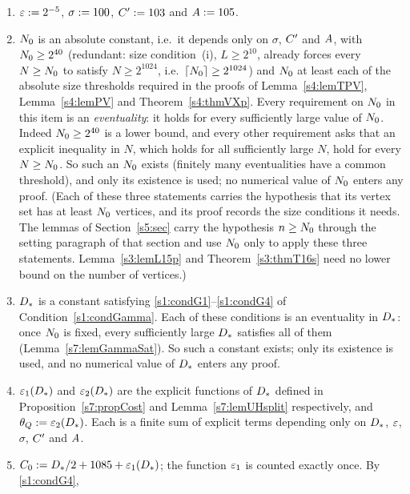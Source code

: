 \begin{definition}\label{s1:defConstants}
\begin{enumerate}
\item[(i)] $\varepsilon\mathrel{:=}2^{-5}$, $\sigma\mathrel{:=}100$, $C'\mathrel{:=}103$ and
$A\mathrel{:=}105$.
\item[(ii)] $N_{0}$ is an absolute constant, i.e.\ it depends only on $\sigma$,
$C'$ and $A$, with $N_{0}\ge2^{40}$ (redundant: size condition~(i),
$L\ge2^{10}$, already forces every $N\ge N_{0}$ to satisfy $N\ge2^{1024}$,
i.e.\ $\lceil N_{0}\rceil\ge2^{1024}$) and $N_{0}$ at least
each of the absolute size thresholds required in the proofs of
Lemma~\ref{s4:lemTPV}, Lemma~\ref{s4:lemPV} and Theorem~\ref{s4:thmVXp}.
Every requirement on $N_{0}$ in this item is an \emph{eventuality}: it holds
for every sufficiently large value of $N_{0}$. Indeed $N_{0}\ge2^{40}$ is a
lower bound, and every other requirement asks that an explicit inequality in
$N$, which holds for all sufficiently large $N$, hold for every $N\ge N_{0}$. So
such an $N_{0}$ exists (finitely many eventualities have a common threshold),
and only its existence is used; no numerical value of $N_{0}$ enters any proof.
(Each of these three statements carries the hypothesis that its vertex set has
at least $N_{0}$ vertices, and its proof records the size conditions it
needs. The lemmas of Section~\ref{s5:sec} carry the hypothesis $n\ge N_{0}$
through the setting paragraph of that section and use $N_{0}$ only to apply
these three statements. Lemma~\ref{s3:lemL15p} and Theorem~\ref{s3:thmT16s}
need no lower bound on the number of vertices.)
\item[(iii)] $D_{*}$ is a constant satisfying \ref{s1:condG1}--\ref{s1:condG4}
of Condition~\ref{s1:condGamma}. Each of these conditions is an eventuality in
$D_{*}$: once $N_{0}$ is fixed, every sufficiently large $D_{*}$ satisfies all
of them (Lemma~\ref{s7:lemGammaSat}). So such a constant exists; only its
existence is used, and no numerical value of $D_{*}$ enters any proof.
\item[(iv)] $\varepsilon_{1}(D_{*})$ and $\varepsilon_{2}(D_{*})$ are the explicit functions
of $D_{*}$ defined in Proposition~\ref{s7:propCost} and
Lemma~\ref{s7:lemUHsplit} respectively, and $\theta_{Q}\mathrel{:=}\varepsilon_{2}(D_{*})$. Each is a finite sum of explicit terms
depending only on $D_{*}$, $\varepsilon$, $\sigma$, $C'$ and $A$.
\item[(v)] $C_{0}\mathrel{:=}D_{*}/2+1085+\varepsilon_{1}(D_{*})$; the function
$\varepsilon_{1}$ is counted exactly once. By \ref{s1:condG4},

\end{enumerate}
\end{definition}
